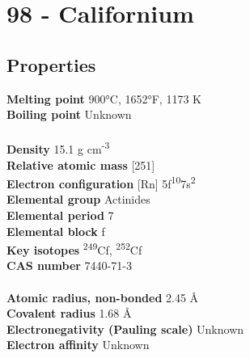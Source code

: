 \section{98 - Californium}
\label{sec:elem-californium}
\subsection{Properties}
\textbf{Melting point} 900°C, 1652°F, 1173 K\\
\textbf{Boiling point} Unknown\\
\\
\textbf{Density} 15.1 g cm\textsuperscript{-3}\\
\textbf{Relative atomic mass} [251]\\
\textbf{Electron configuration} [Rn] 5f\textsuperscript{10}7s\textsuperscript{2}\\
\textbf{Elemental group} Actinides\\
\textbf{Elemental period} 7\\
\textbf{Elemental block} f\\
\textbf{Key isotopes} \textsuperscript{249}Cf, \textsuperscript{252}Cf\\
\textbf{CAS number} 7440-71-3\\
\\
\textbf{Atomic radius, non-bonded} 2.45 Å\\
\textbf{Covalent radius} 1.68 Å\\
\textbf{Electronegativity (Pauling scale)} Unknown\\
\textbf{Electron affinity} Unknown\\